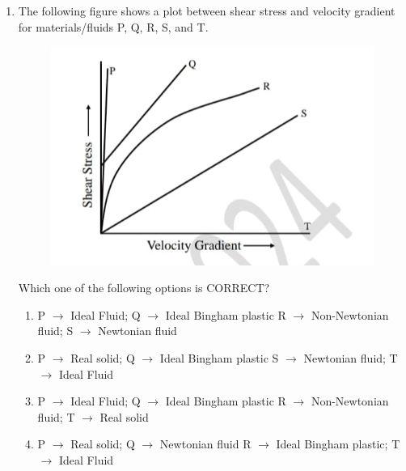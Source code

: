 \documentclass[journal,12pt,onecolumn]{article}
\theoremstyle{remark}
\begin{document}
\begin{enumerate}
    \hfill{}
    \begin{enumerate}
    \end{enumerate}

    \item The following figure  shows a plot between shear stress and velocity gradient for
    materials/fluids P, Q, R, S, and T.
    \begin{figure}[H]
        \centering
        \includegraphics[width=0.7\columnwidth]{figs/2Q24.jpg}
        \caption{}
        \label{fig:q24}
    \end{figure}
    Which one of the following options is CORRECT?
    
    \hfill{}
    \begin{enumerate}
        \item P $\rightarrow$ Ideal Fluid; Q $\rightarrow$ Ideal Bingham plastic
        R $\rightarrow$ Non-Newtonian fluid; S $\rightarrow$ Newtonian fluid
        \item P $\rightarrow$ Real solid; Q $\rightarrow$ Ideal Bingham plastic
        S $\rightarrow$ Newtonian fluid; T $\rightarrow$ Ideal Fluid
        \item P $\rightarrow$ Ideal Fluid; Q $\rightarrow$ Ideal Bingham plastic
        R $\rightarrow$ Non-Newtonian fluid; T $\rightarrow$ Real solid
        \item P $\rightarrow$ Real solid; Q $\rightarrow$ Newtonian fluid
        R $\rightarrow$ Ideal Bingham plastic; T $\rightarrow$ Ideal Fluid
    \end{enumerate}
    

\end{enumerate}
\end{document}

